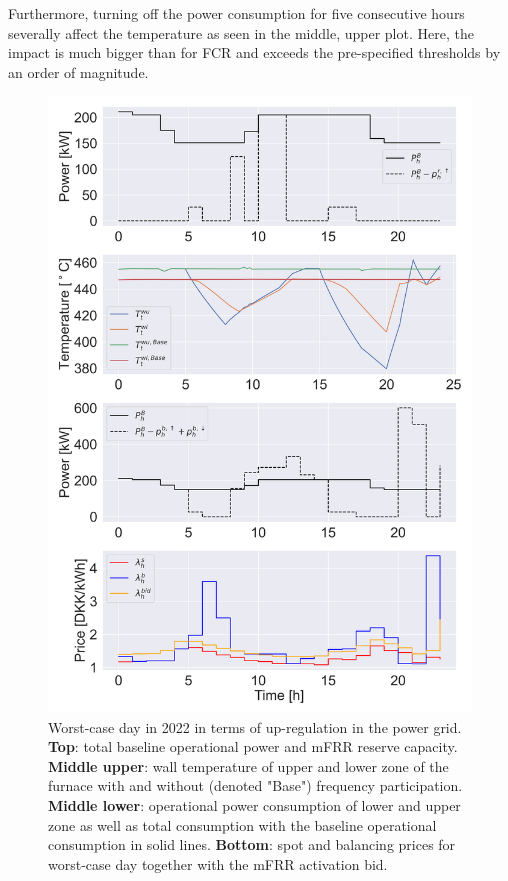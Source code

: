 \documentclass[lettersize,journal]{IEEEtran}
\begin{document}
Furthermore, turning off the power consumption for five consecutive hours severally affect the temperature as seen in the middle, upper plot. Here, the impact is much bigger than for FCR and exceeds the pre-specified thresholds by an order of magnitude.

\begin{figure}[!t]
    \centering
    \includegraphics[width=\columnwidth]{figures/mfrr_single_case.png}
    \caption{Worst-case day in 2022 in terms of up-regulation in the power grid. \textbf{Top}: total baseline operational power and mFRR reserve capacity. \textbf{Middle upper}: wall temperature of upper and lower zone of the furnace with and without (denoted "Base") frequency participation. \textbf{Middle lower}: operational power consumption of lower and upper zone as well as total consumption with the baseline operational consumption in solid lines. \textbf{Bottom}: spot and balancing prices for worst-case day together with the mFRR activation bid.}
    \label{fig:mfrr_single_case}
\end{figure}
\end{document}
